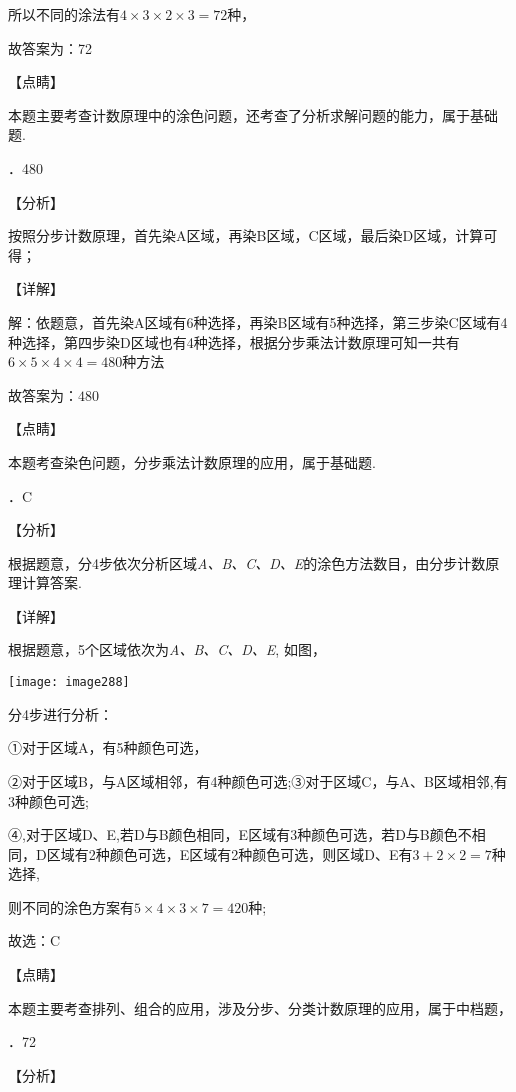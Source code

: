 \noindent 所以不同的涂法有$4\times 3\times 2\times 3=72$种，

\noindent 故答案为：72

\noindent 【点睛】

\noindent 本题主要考查计数原理中的涂色问题，还考查了分析求解问题的能力，属于基础题.

．480

\noindent 【分析】

\noindent 按照分步计数原理，首先染A区域，再染B区域，C区域，最后染D区域，计算可得；

\noindent 【详解】

\noindent 解：依题意，首先染A区域有$6$种选择，再染B区域有5种选择，第三步染C区域有4种选择，第四步染D区域也有4种选择，根据分步乘法计数原理可知一共有$6\times 5\times 4\times 4=480$种方法

\noindent 故答案为：$480$

\noindent 【点睛】

\noindent 本题考查染色问题，分步乘法计数原理的应用，属于基础题.

．C

\noindent 【分析】

\noindent 根据题意，分4步依次分析区域\textit{A、B、C、D、E}的涂色方法数目，由分步计数原理计算答案.

\noindent 【详解】

\noindent 根据题意，5个区域依次为\textit{A、B、C、D、E}, 如图，

\noindent \texttt{[image: image288]}

\noindent 分4步进行分析：

\noindent ①对于区域A，有5种颜色可选，

\noindent ②对于区域B，与A区域相邻，有4种颜色可选;③对于区域C，与A、B区域相邻,有3种颜色可选;

\noindent ④,对于区域D、E,若D与B颜色相同，E区域有3种颜色可选，若D与B颜色不相同，D区域有2种颜色可选，E区域有2种颜色可选，则区域D、E有$3+2\times 2=7$种选择,

\noindent 则不同的涂色方案有$5\times 4\times 3\times 7=420$种;

\noindent 故选：C

\noindent 【点睛】

\noindent 本题主要考查排列、组合的应用，涉及分步、分类计数原理的应用，属于中档题，

．72

\noindent 【分析】

